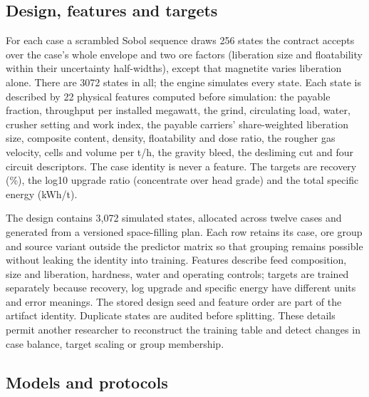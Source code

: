 \documentclass[10pt]{article}
\begin{document}
\subsection{Design, features and
targets}\label{design-features-and-targets}

For each case a scrambled Sobol sequence draws 256 states the contract
accepts over the case's whole envelope and two ore factors (liberation
size and floatability within their uncertainty half-widths), except that
magnetite varies liberation alone. There are 3072 states in all; the
engine simulates every state. Each state is described by 22 physical
features computed before simulation: the payable fraction, throughput
per installed megawatt, the grind, circulating load, water, crusher
setting and work index, the payable carriers' share-weighted liberation
size, composite content, density, floatability and dose ratio, the
rougher gas velocity, cells and volume per t/h, the gravity bleed, the
desliming cut and four circuit descriptors. The case identity is never a
feature. The targets are recovery (\%), the log10 upgrade ratio
(concentrate over head grade) and the total specific energy (kWh/t).

The design contains 3,072 simulated states, allocated across twelve
cases and generated from a versioned space-filling plan. Each row
retains its case, ore group and source variant outside the predictor
matrix so that grouping remains possible without leaking the identity
into training. Features describe feed composition, size and liberation,
hardness, water and operating controls; targets are trained separately
because recovery, log upgrade and specific energy have different units
and error meanings. The stored design seed and feature order are part of
the artifact identity. Duplicate states are audited before splitting.
These details permit another researcher to reconstruct the training
table and detect changes in case balance, target scaling or group
membership.

\subsection{Models and protocols}\label{models-and-protocols}
\end{document}
